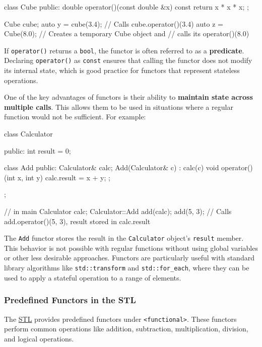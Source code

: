 \begin{codeblock}[language=C++]
class Cube {
public:
    double operator()(const double &x) const { return x * x * x; }
};

Cube cube;
auto y = cube(3.4);   // Calls cube.operator()(3.4)
auto z = Cube{}(8.0); // Creates a temporary Cube object and 
                      //     calls its operator()(8.0)
\end{codeblock}

If \texttt{operator()} returns a \texttt{bool}, the functor is often referred to as a \textbf{predicate}. Declaring \texttt{operator()} as \texttt{const} ensures that calling the functor does not modify its internal state, which is good practice for functors that represent stateless operations.

One of the key advantages of functors is their ability to \textbf{maintain state across multiple calls}. This allows them to be used in situations where a regular function would not be sufficient. For example:

\begin{codeblock}[language=C++]
class Calculator {
public:
    int result = 0;

    class Add {
    public:
        Calculator& calc;
        Add(Calculator& c) : calc(c) {}
        void operator()(int x, int y) { calc.result = x + y; }
    };
};

// in main
Calculator calc;
Calculator::Add add(calc);
add(5, 3); // Calls add.operator()(5, 3), result stored in calc.result
\end{codeblock}

The \texttt{Add} functor stores the result in the \texttt{Calculator} object's \texttt{result} member. This behavior is not possible with regular functions without using global variables or other less desirable approaches. Functors are particularly useful with standard library algorithms like \texttt{std::transform} and \texttt{std::for\_each}, where they can be used to apply a stateful operation to a range of elements.

\subsubsection{Predefined Functors in the STL}

The \hyperref[ch:stl]{STL} provides predefined functors under \texttt{<functional>}. These functors perform common operations like addition, subtraction, multiplication, division, and logical operations.

